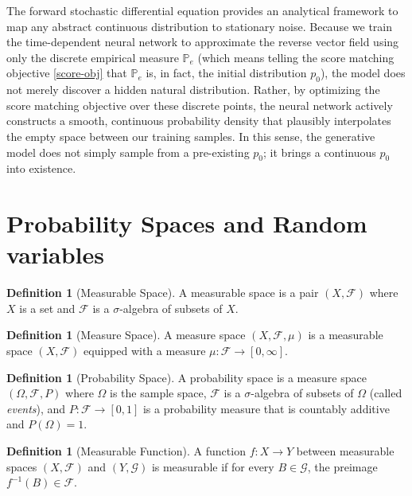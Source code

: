 \documentclass[11pt]{amsart}
\theoremstyle{plain}
\theoremstyle{definition}
\newtheorem{definition}[theorem]{Definition}
\theoremstyle{remark}
\numberwithin{equation}{section}
\begin{document}
{The forward stochastic differential equation provides an analytical framework to map any abstract continuous distribution to stationary noise. Because we train the time-dependent neural network to approximate the reverse vector field using only the discrete empirical measure $\mathbb{P}_e$ (which means telling the score matching objective \eqref{score-obj} that $\mathbb{P}_e$ is, in fact, the initial distribution $p_0$), the model does not merely discover a hidden natural distribution. Rather, by optimizing the score matching objective over these discrete points, the neural network actively constructs a smooth, continuous probability density that plausibly interpolates the empty space between our training samples. In this sense, the generative model does not simply sample from a pre-existing $p_0$; it brings a continuous $p_0$ into existence.




\newpage
\appendix
\section{Probability Spaces and Random variables}
\label{app:A}

\begin{definition}[Measurable Space]
A measurable space is a pair $(X, \mathcal{F})$ where $X$ is a set and $\mathcal{F}$ is a $\sigma$-algebra of subsets of $X$.
\end{definition}

\begin{definition}[Measure Space]
A measure space $(X, \mathcal{F}, \mu)$ is a measurable space $(X, \mathcal{F})$ equipped with a measure $\mu:\mathcal{F} \to [0, \infty]$.
\end{definition}

\begin{definition}[Probability Space]
A probability space is a measure space $(\Omega, \mathcal{F}, P)$ where $\Omega$ is the sample space, $\mathcal{F}$ is a $\sigma$-algebra of subsets of $\Omega$ (called \textit{events}), and $P: \mathcal{F} \to [0,1]$ is a probability measure that is countably additive and $P(\Omega)=1$.
\end{definition}

\begin{definition}[Measurable Function]
A function $f: X \to Y$ between measurable spaces $(X, \mathcal{F})$ and $(Y, \mathcal{G})$ is measurable if for every $B \in \mathcal{G}$, the preimage $f^{-1}(B) \in \mathcal{F}$.
\end{definition}

}
\end{document}

